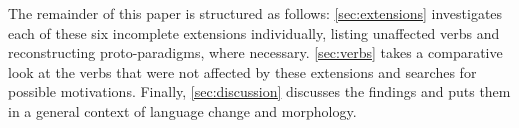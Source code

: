 The remainder of this paper is structured as follows:
\cref{sec:extensions} investigates each of these six incomplete extensions individually, listing unaffected verbs and reconstructing proto-paradigms, where necessary.
\cref{sec:verbs} takes a comparative look at the verbs that were not affected by these extensions and searches for possible motivations.
Finally, \cref{sec:discussion} discusses the findings and puts them in a general context of language change and morphology.



%
